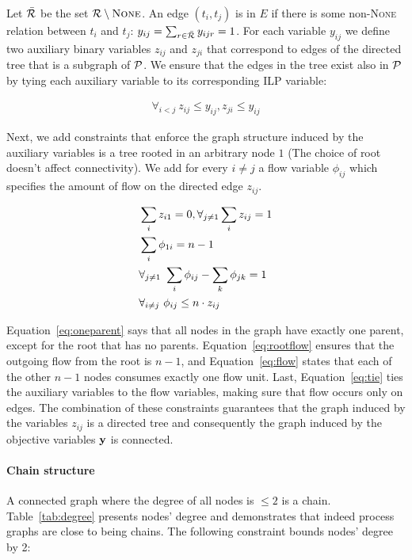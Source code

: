  Let $\bar{\mathcal{R}}$ be the set $\mathcal{R} \setminus \mbox{\textsc{None}}$. An edge $(t_i,t_j)$ is in $E$ if there is some non-\textsc{None} relation between $t_i$ and $t_j$: $y_{ij}=\sum_{r \in \bar{\mathcal{R}}} y_{ijr}=1$. For each variable $y_{ij}$ we define two auxiliary binary variables $z_{ij}$ and $z_{ji}$ that correspond to edges of the directed tree that is a subgraph of $\mathcal{P}$. We ensure that the edges in the tree exist also in $\mathcal{P}$ by tying each auxiliary variable to its corresponding ILP variable:
 
\begin{align}
\forall_{i<j} \ z_{ij} \leq y_{ij}, z_{ji} \leq y_{ij}
\end{align}

Next, we add constraints that enforce the graph structure induced by the auxiliary variables is a tree rooted in an arbitrary node $1$ (The choice of root doesn't affect connectivity). We add for every $i \neq j$ a flow variable $\phi_{ij}$ which specifies the amount of flow on the directed edge $z_{ij}$.

\begin{align}
\small &\sum_{i} z_{i1} =0, \forall_{j \neq 1} \sum_{i} z_{ij}=1 \label{eq:oneparent} \\ 
&\sum_{i} \phi_{1i}=n-1 \label{eq:rootflow} \\ 
&\forall_{j \neq 1} \ \sum_{i} \phi_{ij} - \sum_{k} \phi_{jk}=1 \label{eq:flow} \\
&\forall_{i \neq j} \ \phi_{ij} \leq n \cdot z_{ij} \label{eq:tie} 
\end{align}

Equation~\ref{eq:oneparent} says that all nodes in the graph have exactly one parent, except for the root that has no parents. Equation~\ref{eq:rootflow} ensures that the outgoing flow from the root is $n-1$, and Equation~\ref{eq:flow} states that each of the other $n-1$ nodes consumes exactly one flow unit. Last, Equation~\ref{eq:tie} ties the auxiliary variables to the flow variables, making sure that flow occurs only on edges. The combination of these constraints guarantees that the graph induced by the variables $z_{ij}$ is a directed tree and consequently the graph induced by the objective variables $\mathbf{y}$ is connected.

\paragraph{Chain structure} 
A connected graph where the degree of all nodes is $\leq 2$ is a chain. Table~\ref{tab:degree} presents nodes' degree and demonstrates that indeed process graphs are close to being chains. The following constraint bounds nodes' degree by 2:

